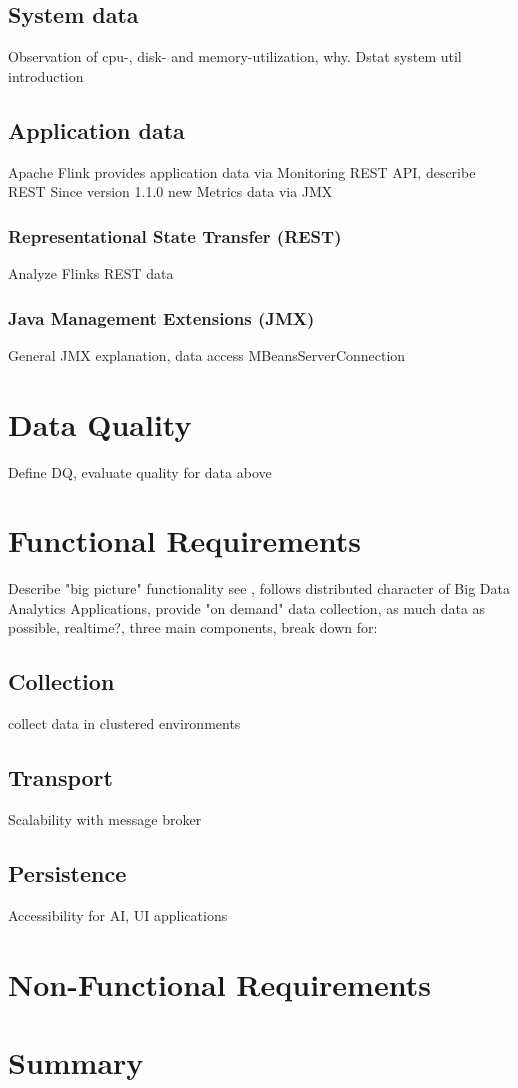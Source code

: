 \subsection{System data}

Observation of cpu-, disk- and memory-utilization, why.
Dstat system util introduction

\subsection{Application data}

Apache Flink provides application data via Monitoring REST API, describe REST
Since version 1.1.0 new Metrics data via JMX

\subsubsection{Representational State Transfer (REST)}

Analyze Flinks REST data

\subsubsection{{Java Management Extensions (JMX)}}

General JMX explanation, data access MBeansServerConnection

\section{Data Quality}

Define DQ, evaluate quality for data above

\section{Functional Requirements}

Describe "big picture" functionality see \cite{VanL14}, follows distributed character of Big Data Analytics
Applications, provide "on demand" data collection, as much data as possible, realtime?, three main components,
break down for:

\subsection{Collection}

collect data in clustered environments

\subsection{Transport}

Scalability with message broker

\subsection{Persistence}

Accessibility for AI, UI applications

\section{Non-Functional Requirements}



\section{Summary}